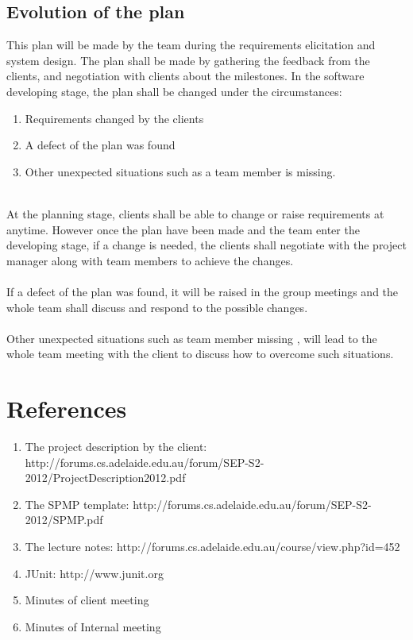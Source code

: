 \documentclass[11pt, a4paper]{report}
\begin{document}
\section{Evolution of the plan}
This plan will be made by the team during the requirements elicitation and system design. The plan shall be made by gathering the feedback from the clients, and negotiation with clients about the milestones. In the software developing stage, the plan shall be changed under the circumstances:
\begin{enumerate}
	\item Requirements changed by the clients
	\item A defect of the plan was found
	\item Other unexpected situations such as a team member is missing. \\ \\
\end{enumerate} 
At the planning stage, clients shall be able to change or raise requirements at anytime. However once the plan have been made and the team enter the developing stage, if a change is needed, the clients shall negotiate with the project manager along with team members to achieve the changes. \\ \\
If a defect of the plan was found, it will be raised in the group meetings and the whole team shall discuss and respond to the possible changes.\\ \\
Other unexpected situations such as team member missing , will lead to the whole team meeting with the client to discuss how to overcome such situations. 


\pagebreak


\chapter{References}
\begin{enumerate}
\item The project description by the client:
http://forums.cs.adelaide.edu.au/forum/SEP-S2-2012/ProjectDescription2012.pdf
\item The SPMP template:
http://forums.cs.adelaide.edu.au/forum/SEP-S2-2012/SPMP.pdf
\item The lecture notes:
http://forums.cs.adelaide.edu.au/course/view.php?id=452
\item JUnit:
http://www.junit.org
\item Minutes of client meeting
\item Minutes of Internal meeting
\end{enumerate}
\end{document}
